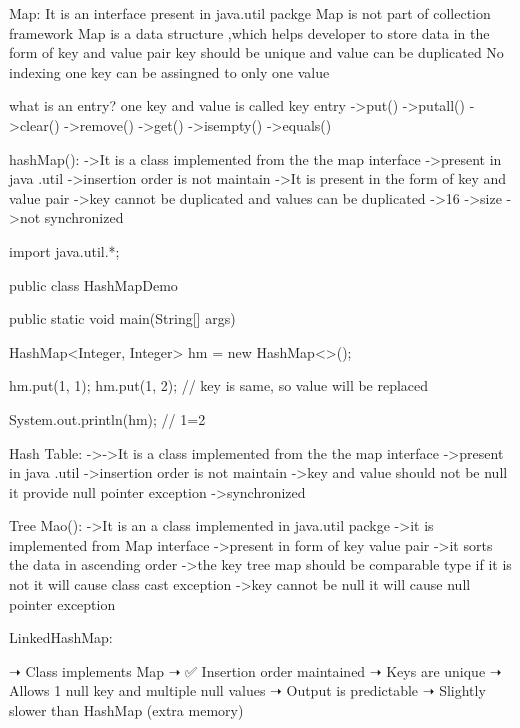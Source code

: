 {{{{{{{{Map:       
          It is an interface present in java.util packge
          Map is not part of collection framework
          Map is a data structure ,which helps developer to store data in the form of key and value pair
          key should be unique and value can be duplicated
          No indexing
          one key can be assingned to only one value

   what is an entry?
             one key and value is called key entry
             ->put()
             ->putall()
             ->clear()
             ->remove()
             ->get()
             ->isempty()
             ->equals()

 hashMap():
           ->It is a class implemented from the the map interface
           ->present in java .util
           ->insertion order is not maintain
           ->It is present in the form of key and value pair
           ->key cannot be duplicated and values can be duplicated
           ->16 ->size
           ->not synchronized

  import java.util.*;

public class HashMapDemo {
    public static void main(String[] args) {

        HashMap<Integer, Integer> hm = new HashMap<>();

        hm.put(1, 1);
        hm.put(1, 2);   // key is same, so value will be replaced

        System.out.println(hm);  // {1=2}
    }
}

Hash Table:
          ->->It is a class implemented from the the map interface
           ->present in java .util
             ->insertion order is not maintain
             ->key and value should not be null it provide null pointer exception
             ->synchronized

Tree Mao():
          ->It is an a class implemented in java.util packge
          ->it is implemented from Map interface
          ->present in form of key value pair
          ->it sorts the data in ascending order
          ->the key tree map should be comparable type if it is not it will cause class cast exception
          ->key cannot be null it will cause null pointer exception

LinkedHashMap:

          ➝ Class implements Map
          ➝ ✅ Insertion order maintained
          ➝ Keys are unique
          ➝ Allows 1 null key and multiple null values
          ➝ Output is predictable
          ➝ Slightly slower than HashMap (extra memory)

}}}}}}}}
